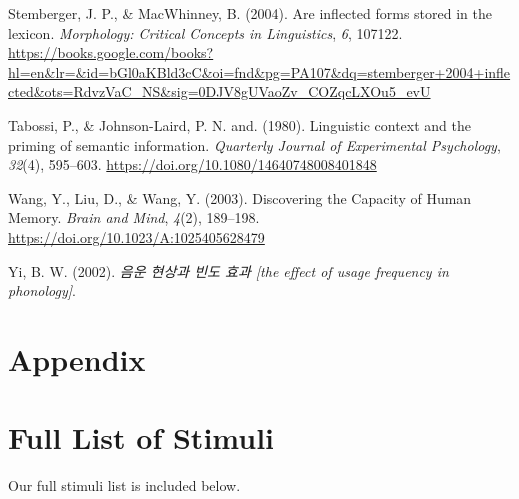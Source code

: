 \documentclass[
  12pt,
]{scrartcl}
\newlength{\cslhangindent}
\newenvironment{CSLReferences}[2] %
 {\begin{list}{}{%
  \setlength{\itemindent}{0pt}
  \setlength{\leftmargin}{0pt}
  \setlength{\parsep}{0pt}
  \ifodd #1
   \setlength{\leftmargin}{\cslhangindent}
   \setlength{\itemindent}{-1\cslhangindent}
  \fi
  \setlength{\itemsep}{#2\baselineskip}}}
 {\end{list}}
\begin{document}
\begin{CSLReferences}{1}{0}
Stemberger, J. P., \& MacWhinney, B. (2004). Are inflected forms stored
in the lexicon. \emph{Morphology: Critical Concepts in Linguistics},
\emph{6}, 107122.
\url{https://books.google.com/books?hl=en&lr=&id=bGl0aKBld3cC&oi=fnd&pg=PA107&dq=stemberger+2004+inflected&ots=RdvzVaC_NS&sig=0DJV8gUVaoZv_COZqcLXOu5_evU}

Tabossi, P., \& Johnson-Laird, P. N. and. (1980). Linguistic context and
the priming of semantic information. \emph{Quarterly Journal of
Experimental Psychology}, \emph{32}(4), 595--603.
\url{https://doi.org/10.1080/14640748008401848}

Wang, Y., Liu, D., \& Wang, Y. (2003). Discovering the Capacity of Human
Memory. \emph{Brain and Mind}, \emph{4}(2), 189--198.
\url{https://doi.org/10.1023/A:1025405628479}

Yi, B. W. (2002). \emph{음운 현상과 빈도 효과 {[}the effect of usage
frequency in phonology{]}}.

\end{CSLReferences}

\newpage

\section*{Appendix}\label{appendix}

\appendix

\renewcommand{\thesection}{\Alph{section}}

\setcounter{section}{0}



\section{Full List of Stimuli}\label{sec-full-list-of-stimuli}

Our full stimuli list is included below.
\end{document}
